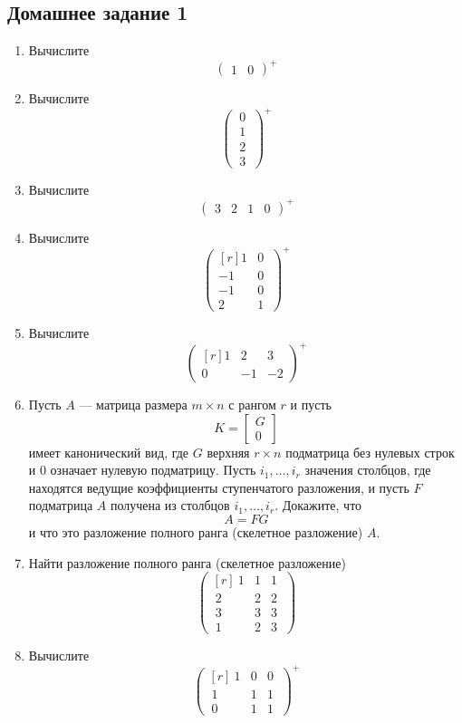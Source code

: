 \documentclass[12pt]{article}
\begin{document}
	\subsection{Домашнее задание 1}\begin{enumerate}
		\item Вычислите \[\begin{pmatrix} 1&0\end{pmatrix}^+\]
		\item Вычислите \[\begin{pmatrix} ~0~\\~1~\\~2~\\~3~\end{pmatrix}^+\]
		\item Вычислите \[\begin{pmatrix} 3&2&1&0 \end{pmatrix}^+\]
		\item Вычислите \[\begin{pmatrix}[r] 1&0~\\-1 & 0~\\-1 & 0~\\ 2&1~\end{pmatrix}^+\]
		\item Вычислите  \[\begin{pmatrix}[r] 1&2&3\\0 & -1 & -2\end{pmatrix}^+\]
		\item Пусть $A $ --- матрица размера $m\times n$
		с рангом $r$ и пусть
		$$
		K = \left[ \begin{array}{c} G \\ \hline  0\end{array} \right]
		$$
		имеет канонический вид,
		где $G$ верхняя $r\times n$ подматрица без нулевых строк и
		$0$ означает нулевую подматрицу. Пусть $i_1, \dots ,i_r$ значения столбцов, где находятся ведущие коэффициенты ступенчатого разложения, и пусть $F$ подматрица $A$ получена из столбцов $i_1,
		\dots , i_r$.  Докажите, что
		$$
		A = FG
		$$
		и что это разложение полного ранга (скелетное разложение) $A$.
		\item Найти разложение полного ранга (скелетное разложение)
		\[\begin{pmatrix}[r] ~1&1&1~\\~2 & 2 & 2~\\~3 & 3 & 3~\\ ~1&2&3~\end{pmatrix}\]
		\item Вычислите  \[\begin{pmatrix}[r] ~1&0&0~\\~1 & 1 & 1~\\~0 & 1 & 1~\end{pmatrix}^+\]

\end{enumerate}
\end{document}
